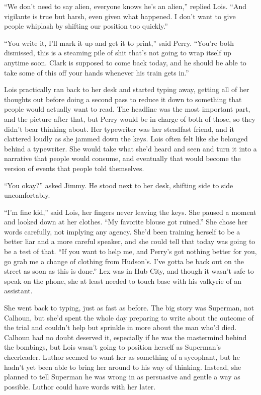 \documentclass[ebook,12pt]{memoir}
\begin{document}
``We don't need to say alien, everyone knows he's an alien,'' replied
Lois. ``And vigilante is true but harsh, even given what happened. I
don't want to give people whiplash by shifting our position too
quickly.''

``You write it, I'll mark it up and get it to print,'' said Perry.
``You're both dismissed, this is a steaming pile of shit that's not
going to wrap itself up anytime soon. Clark is supposed to come back
today, and he should be able to take some of this off your hands
whenever his train gets in.''

Lois practically ran back to her desk and started typing away, getting
all of her thoughts out before doing a second pass to reduce it down to
something that people would actually want to read. The headline was the
most important part, and the picture after that, but Perry would be in
charge of both of those, so they didn't bear thinking about. Her
typewriter was her steadfast friend, and it clattered loudly as she
jammed down the keys. Lois often felt like she belonged behind a
typewriter. She would take what she'd heard and seen and turn it into a
narrative that people would consume, and eventually that would become
the version of events that people told themselves.

``You okay?'' asked Jimmy. He stood next to her desk, shifting side to
side uncomfortably.

``I'm fine kid,'' said Lois, her fingers never leaving the keys. She
paused a moment and looked down at her clothes. ``My favorite blouse got
ruined.'' She chose her words carefully, not implying any agency. She'd
been training herself to be a better liar and a more careful speaker,
and she could tell that today was going to be a test of that. ``If you
want to help me, and Perry's got nothing better for you, go grab me a
change of clothing from Hudson's. I've gotta be back out on the street
as soon as this is done.'' Lex was in Hub City, and though it wasn't
safe to speak on the phone, she at least needed to touch base with his
valkyrie of an assistant.

She went back to typing, just as fast as before. The big story was
Superman, not Calhoun, but she'd spent the whole day preparing to write
about the outcome of the trial and couldn't help but sprinkle in more
about the man who'd died. Calhoun had no doubt deserved it, especially
if he was the mastermind behind the bombings, but Lois wasn't going to
position herself as Superman's cheerleader. Luthor seemed to want her as
something of a sycophant, but he hadn't yet been able to bring her
around to his way of thinking. Instead, she planned to tell Superman he
was wrong in as persuasive and gentle a way as possible. Luthor could
have words with her later.
\end{document}
